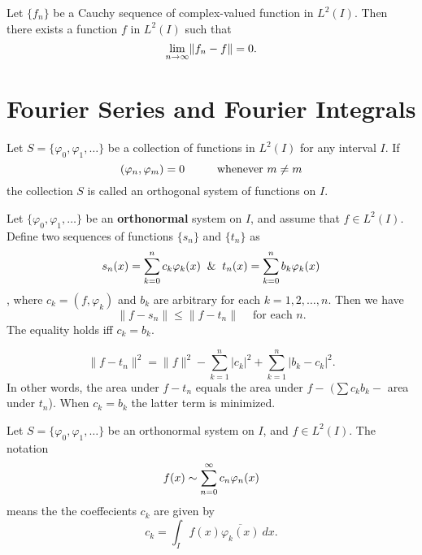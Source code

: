 \documentclass[10pt,a4paper]{book}
\begin{document}
\begin{Thm}
Let $\{f_n\}$ be a Cauchy sequence of complex-valued function in $L^2(I)$. Then there exists a function $f$ in $L^2(I)$ such that
$$\lim_{ n \to \infty} \lVert f_n - f\rVert = 0.$$
\end{Thm}
\chapter{Fourier Series and Fourier Integrals}
\renewcommand{\phi}{\varphi}
\begin{deff}
Let $S = \{\phi_0, \phi_1, \dots \}$ be a collection of functions in $L^2(I)$ for any interval $I$. If
$$(\phi_n, \phi_m) = 0 \hspace*{1cm} \text{whenever } m \neq m$$
the collection $S$ is called an orthogonal system of functions on $I$.
\end{deff}
\begin{Thm}
Let $\{\phi_0, \phi_1, \dots\}$ be an \textbf{orthonormal} system on $I$, and assume that $f \in L^2(I)$. Define two sequences of functions $\{s_n\}$ and $\{t_n\}$ as
$$s_n(x) = \sum_{k = 0}^nc_k \phi_k(x) \And t_n(x) = \sum_{k = 0}^nb_k\phi_k(x)$$
, where $c_k = (f,\phi_k)$ and $b_k$ are arbitrary for each $k = 1,2, \dots, n$. Then we have
$$\lVert f-s_n\rVert \leq \lVert f -t_n \rVert \ \ \ \ \text{ for each } n.$$
The equality holds iff $c_k = b_k$.

\end{Thm}
\PP $$\lVert f-t_n\rVert^2 = \lVert f \rVert^2 - \sum_{k=1}^n |c_k|^2 + \sum_{k=1}^n|b_k - c_k|^2.$$
In other words, the area under $f-t_n$ equals the area under $f -$  $( \sum c_k b_k -$ area under $t_n$). When $c_k = b_k$ the latter term is minimized. 
\begin{deff}
Let $S  = \{\phi_0, \phi_1, \dots\}$ be an orthonormal system on $I$, and $f\in L^2(I)$. The notation 
$$ f(x) \sim \sinf[n]0c_n\phi_n(x)$$
means the the coeffecients $c_k$ are given by
$$c_k = \int_I f(x)\overline{\phi_k(x)}\ dx .$$
\end{deff}
\end{document}
